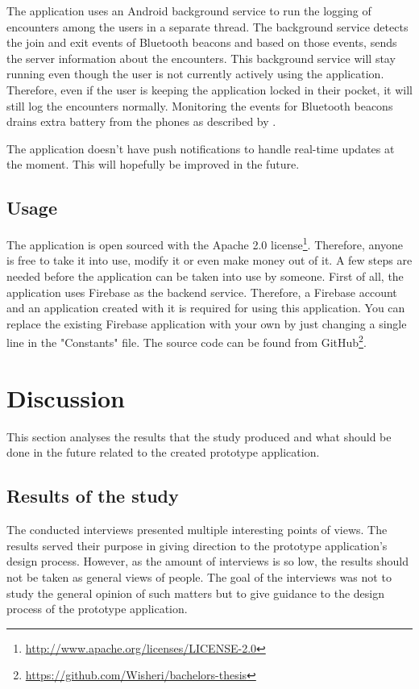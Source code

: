 The application uses an Android background service to run the logging of encounters among the users in a separate thread. The background service detects the join and exit events of Bluetooth beacons and based on those events, sends the server information about the encounters. This background service will stay running even though the user is not currently actively using the application. Therefore, even if the user is keeping the application locked in their pocket, it will still log the encounters normally. Monitoring the events for Bluetooth beacons drains extra battery from the phones as described by \cite{bluetoothOverview}.

The application doesn't have push notifications to handle real-time updates at the moment. This will hopefully be improved in the future.

\subsection{Usage}

The application is open sourced with the Apache 2.0 license\footnote{\url{http://www.apache.org/licenses/LICENSE-2.0}}. Therefore, anyone is free to take it into use, modify it or even make money out of it. A few steps are needed before the application can be taken into use by someone. First of all, the application uses Firebase as the backend service. Therefore, a Firebase account and an application created with it is required for using this application. You can replace the existing Firebase application with your own by just changing a single line in the "Constants" file. The source code can be found from GitHub\footnote{\url{https://github.com/Wisheri/bachelors-thesis}}.
\clearpage

\section{Discussion}

This section analyses the results that the study produced and what should be done in the future related to the created prototype application.

\subsection{Results of the study}

The conducted interviews presented multiple interesting points of views. The results served their purpose in giving direction to the prototype application's design process. However, as the amount of interviews is so low, the results should not be taken as general views of people. The goal of the interviews was not to study the general opinion of such matters but to give guidance to the design process of the prototype application.

